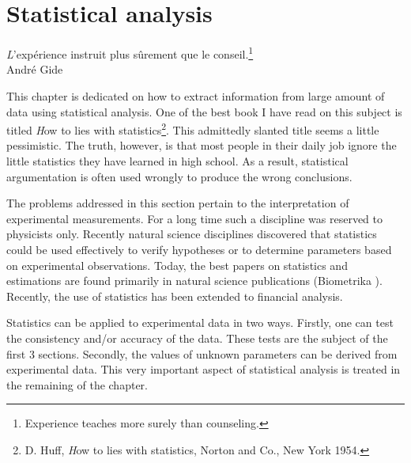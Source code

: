 %
%

\chapter{Statistical analysis}
\label{ch:estimation}
\begin{flushright}
{\textsl L'expérience instruit plus sûrement que le
conseil.}\footnote{Experience teaches more surely than
counseling.}\\ André Gide
\end{flushright}
\vspace{1 ex}This chapter is dedicated on how to extract
information from large amount of data using statistical analysis.
One of the best book I have read on this subject is titled {\textsl
How to lies with statistics}\footnote{D. Huff, {\textsl How to lies
  with statistics}, Norton and Co., New York 1954.}.
This admittedly slanted title seems a little pessimistic.
The truth, however, is that most people in their daily job ignore the little statistics
they have learned in high school.
As a result, statistical argumentation is often used wrongly to produce the wrong
conclusions.

The problems addressed in this section pertain to the
interpretation of experimental measurements.
For a long time such a discipline was reserved to physicists only. Recently natural
science disciplines discovered that statistics could be used
effectively to verify hypotheses or to determine parameters based
on experimental observations.
Today, the best papers on statistics and estimations are found primarily in natural science
publications (Biometrika \eg).
Recently, the use of statistics has been extended to financial analysis.

Statistics can be applied to experimental data in two ways.
Firstly, one can test the consistency and/or accuracy of the data.
These tests are the subject of the first 3 sections. Secondly, the
values of unknown parameters can be derived from experimental
data. This very important aspect of statistical analysis is
treated in the remaining of the chapter.

